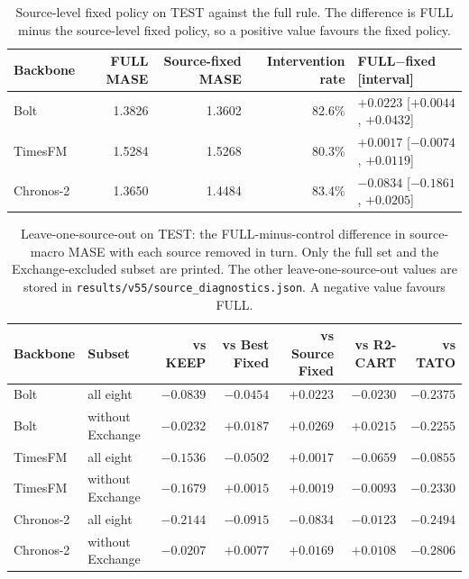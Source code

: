 \documentclass{article}
\begin{document}
\begin{table}[!t]
\centering\small
\caption{Source-level fixed policy on TEST against the full rule. The difference is FULL
minus the source-level fixed policy, so a positive value favours the fixed policy.}
\label{tab:v53-source-fixed}
\begin{tabular*}{\textwidth}{@{\extracolsep{\fill}}lrrrl@{}}
\toprule
Backbone & FULL MASE & Source-fixed MASE & Intervention rate & FULL$-$fixed [interval] \\
\midrule
Bolt & 1.3826 & 1.3602 & 82.6\% & $+0.0223$ [$+0.0044$, $+0.0432$] \\
TimesFM & 1.5284 & 1.5268 & 80.3\% & $+0.0017$ [$-0.0074$, $+0.0119$] \\
Chronos-2 & 1.3650 & 1.4484 & 83.4\% & $-0.0834$ [$-0.1861$, $+0.0205$] \\
\bottomrule
\end{tabular*}
\end{table}

\begin{table}[!t]
\centering\small
\caption{Leave-one-source-out on TEST: the FULL-minus-control difference in source-macro
MASE with each source removed in turn. Only the full set and the Exchange-excluded subset
are printed. The other leave-one-source-out values are stored in
\texttt{results/v55/source\_diagnostics.json}. A negative value favours FULL.}
\label{tab:v53-loso}
\begin{tabular*}{\textwidth}{@{\extracolsep{\fill}}llrrrrr@{}}
\toprule
Backbone & Subset & vs KEEP & vs Best Fixed & vs Source Fixed & vs R2-CART & vs TATO \\
\midrule
Bolt & all eight & $-0.0839$ & $-0.0454$ & $+0.0223$ & $-0.0230$ & $-0.2375$ \\
Bolt & without Exchange & $-0.0232$ & $+0.0187$ & $+0.0269$ & $+0.0215$ & $-0.2255$ \\
TimesFM & all eight & $-0.1536$ & $-0.0502$ & $+0.0017$ & $-0.0659$ & $-0.0855$ \\
TimesFM & without Exchange & $-0.1679$ & $+0.0015$ & $+0.0019$ & $-0.0093$ & $-0.2330$ \\
Chronos-2 & all eight & $-0.2144$ & $-0.0915$ & $-0.0834$ & $-0.0123$ & $-0.2494$ \\
Chronos-2 & without Exchange & $-0.0207$ & $+0.0077$ & $+0.0169$ & $+0.0108$ & $-0.2806$ \\
\bottomrule
\end{tabular*}
\end{table}
\end{document}
